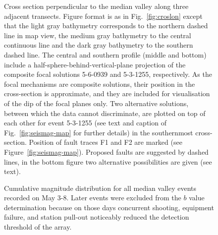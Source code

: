\documentclass[jgr]{agu2001}
\newlength{\tw}
\begin{document}
\begin{figure}




\caption{Cross section perpendicular to the median valley along three
adjacent transects.  Figure format is as in
Fig.~\protect\ref{fig:croslon} except that the light gray bathymetry
corresponds to  the northern dashed line in map view,
the medium gray bathymetry  to the central continuous line and the
dark gray bathymetry to the southern dashed line. The central and
southern profile (middle and bottom) include a
half-sphere-behind-vertical-plane projection of the
composite focal solutions 5-6-0939 and 5-3-1255, respectively. As the
focal mechanisms are composite solutions, their position in the
cross-section is approximate, and they are included for
visualisation of the dip of the focal planes only. Two alternative
solutions, between which the data cannot discriminate, are plotted on
top of each other for
event 5-3-1255 (see text and caption of
Fig.~\protect\ref{fig:seismag-map} for further details) in the
southernmost cross-section. 
Position of fault traces  F1 and F2 are marked (see Figure~\protect\ref{fig:seismag-map}).
Proposed faults are suggested by dashed lines, in the bottom figure two alternative possibilities are given
 (see text).}

\label{fig:croslat}
\end{figure}

\begin{figure}

\caption{Cumulative magnitude distribution for all median valley events recorded on
May 3-8.  Later events were excluded from the $b$ value
determination because on those days concurrent shooting, equipment
failure, and station pull-out noticeably  reduced the detection
threshold of the array.   }
\label{fig:magnitude}
\end{figure}
\end{document}
